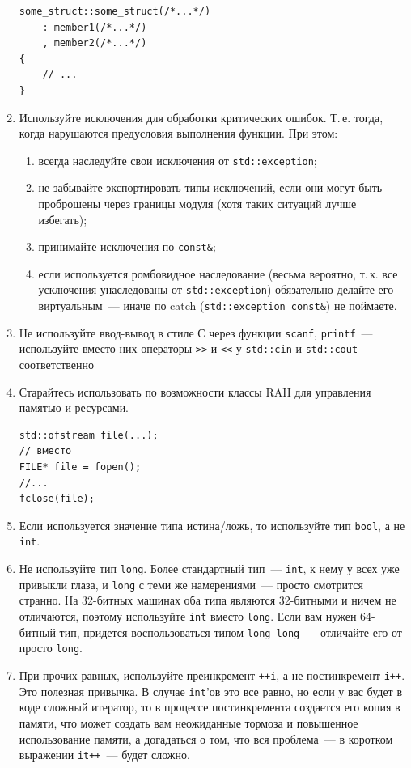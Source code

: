 \documentclass[a4paper,10pt]{article}
\begin{document}
\begin{enumerate}
\begin{lstlisting}
some_struct::some_struct(/*...*/)
    : member1(/*...*/)
    , member2(/*...*/)
{
    // ...
}
\end{lstlisting}
    \item Используйте исключения для обработки критических ошибок. Т.\,е. тогда,
        когда нарушаются предусловия выполнения функции. При этом:
        \begin{enumerate}
            \item всегда наследуйте свои исключения от \verb!std::exception!;
            \item не забывайте экспортировать типы исключений, если они могут быть
                проброшены через границы модуля (хотя таких ситуаций лучше избегать);
            \item принимайте исключения по \verb!const&!;
            \item если используется ромбовидное наследование (весьма вероятно, т.\,к. все
                усключения унаследованы от \verb!std::exception!) обязательно делайте его
                виртуальным~— иначе по catch (\verb!std::exception const&!) не поймаете.
          \end{enumerate}
    \item Не используйте ввод-вывод в стиле С через функции {\tt scanf}, {\tt printf}~—
        используйте вместо них операторы \lstinline`>>` и \lstinline`<<` у {\tt std::cin} и {\tt std::cout}
        соответственно
    \item Старайтесь использовать по возможности классы RAII для управления
        памятью и ресурсами. 
\begin{lstlisting}
std::ofstream file(...);
// вместо 
FILE* file = fopen();
//...
fclose(file);
\end{lstlisting}
    \item Если используется значение типа истина/ложь, то используйте тип {\tt bool}, а
        не {\tt int}.
    \item Не используйте тип {\tt long}. Более стандартный тип~— {\tt int}, к нему у всех уже
        привыкли глаза, и {\tt long} с теми же намерениями~— просто смотрится странно.
        На 32-битных машинах оба типа являются 32-битными и ничем не отличаются, 
        поэтому используйте {\tt int} вместо {\tt long}. Если вам нужен 64-битный тип,
        придется воспользоваться типом {\tt long long}~— отличайте его от просто
        {\tt long}.
    \item При прочих равных, используйте преинкремент {\tt ++i}, а не
        постинкремент {\tt i++}.
        Это полезная привычка. В случае {\tt int}’ов это все равно, но если у вас будет
        в коде сложный итератор, то в процессе постинкремента создается его копия в памяти, что может создать вам неожиданные тормоза и повышенное
        использование памяти, а догадаться о том, что вся проблема~— в коротком
        выражении {\tt it++}~— будет сложно.


\end{enumerate}
\end{document}
